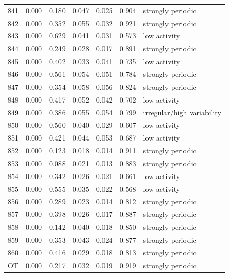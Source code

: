 \begin{longtable}{lrrrrrl}
841 & 0.000 & 0.180 & 0.047 & 0.025 & 0.904 & strongly periodic \\
842 & 0.000 & 0.352 & 0.055 & 0.032 & 0.921 & strongly periodic \\
843 & 0.000 & 0.629 & 0.041 & 0.031 & 0.573 & low activity \\
844 & 0.000 & 0.249 & 0.028 & 0.017 & 0.891 & strongly periodic \\
845 & 0.000 & 0.402 & 0.033 & 0.041 & 0.735 & low activity \\
846 & 0.000 & 0.561 & 0.054 & 0.051 & 0.784 & strongly periodic \\
847 & 0.000 & 0.354 & 0.058 & 0.056 & 0.824 & strongly periodic \\
848 & 0.000 & 0.417 & 0.052 & 0.042 & 0.702 & low activity \\
849 & 0.000 & 0.386 & 0.055 & 0.054 & 0.799 & irregular/high variability \\
850 & 0.000 & 0.560 & 0.040 & 0.029 & 0.607 & low activity \\
851 & 0.000 & 0.421 & 0.044 & 0.053 & 0.687 & low activity \\
852 & 0.000 & 0.123 & 0.018 & 0.014 & 0.911 & strongly periodic \\
853 & 0.000 & 0.088 & 0.021 & 0.013 & 0.883 & strongly periodic \\
854 & 0.000 & 0.342 & 0.026 & 0.021 & 0.661 & low activity \\
855 & 0.000 & 0.555 & 0.035 & 0.022 & 0.568 & low activity \\
856 & 0.000 & 0.289 & 0.023 & 0.014 & 0.812 & strongly periodic \\
857 & 0.000 & 0.398 & 0.026 & 0.017 & 0.887 & strongly periodic \\
858 & 0.000 & 0.142 & 0.040 & 0.018 & 0.850 & strongly periodic \\
859 & 0.000 & 0.353 & 0.043 & 0.024 & 0.877 & strongly periodic \\
860 & 0.000 & 0.416 & 0.029 & 0.018 & 0.813 & strongly periodic \\
OT & 0.000 & 0.217 & 0.032 & 0.019 & 0.919 & strongly periodic \\
\bottomrule
\end{longtable}